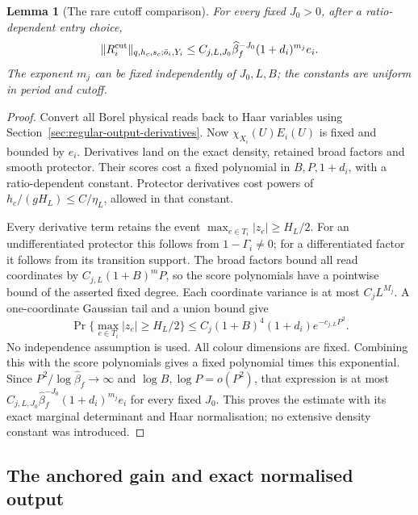 \documentclass[11pt,reqno]{amsart}
\numberwithin{equation}{section}
\newtheorem{lemma}[theorem]{Lemma}
\theoremstyle{definition}
\theoremstyle{remark}
\begin{document}
\begin{lemma}[The rare cutoff comparison]
\label{lem:sharp-cutoff-remainder}
For every fixed \(J_0>0\), after a ratio-dependent entry
choice,
\begin{equation}
 \|R_i^{\rm cut}\|_{q,h_c,s_c;\bar o_i,Y_i}
        \le C_{j,L,J_0}\widehat\beta_f^{-J_0}
                                      (1+d_i)^{m_j}e_i.
 \label{eq:sharp-cutoff-address-price}
\end{equation}
The exponent \(m_j\) can be fixed independently of
\(J_0,L,B\); the constants are uniform in period and cutoff.
\end{lemma}
\begin{proof}
Convert all Borel physical reads back to Haar variables
using Section~\ref{sec:regular-output-derivatives}. Now
\(\chi_{X_i}(U)E_i(U)\) is fixed and bounded by \(e_i\).
Derivatives land on the exact density, retained broad
factors and smooth protector. Their scores cost a fixed
polynomial in \(B,P,1+d_i\), with a ratio-dependent
constant. Protector derivatives cost powers of
\(h_c/(gH_L)\le C/\eta_L\), allowed in that constant.

Every derivative term retains the event
\(\max_{e\in T_i}|z_e|\ge H_L/2\). For an undifferentiated
protector this follows from \(1-\Gamma_i\ne0\); for a
differentiated factor it follows from its transition
support. The broad factors bound all read coordinates by
\(C_{j,L}(1+B)^mP\), so the score polynomials have a
pointwise bound of the asserted fixed degree. Each
coordinate variance is at most \(C_jL^{M_j}\). A
one-coordinate Gaussian tail and a union bound give
\[
 \Pr\{\max_{e\in T_i}|z_e|\ge H_L/2\}
        \le C_j(1+B)^4(1+d_i)e^{-c_{j,L}P^2}.
\]
No independence assumption is used. All colour dimensions
are fixed. Combining this with the score polynomials
gives a fixed polynomial times this exponential. Since
\(P^2/\log\widehat\beta_f\to\infty\) and
\(\log B,\log P=o(P^2)\), that expression is at most
\(C_{j,L,J_0}\widehat\beta_f^{-J_0}(1+d_i)^{m_j}e_i\)
for every fixed \(J_0\). This proves the estimate with
its exact marginal determinant and Haar normalisation;
no extensive density constant was introduced.
\end{proof}

\subsection{The anchored gain and exact normalised output}
\end{document}
